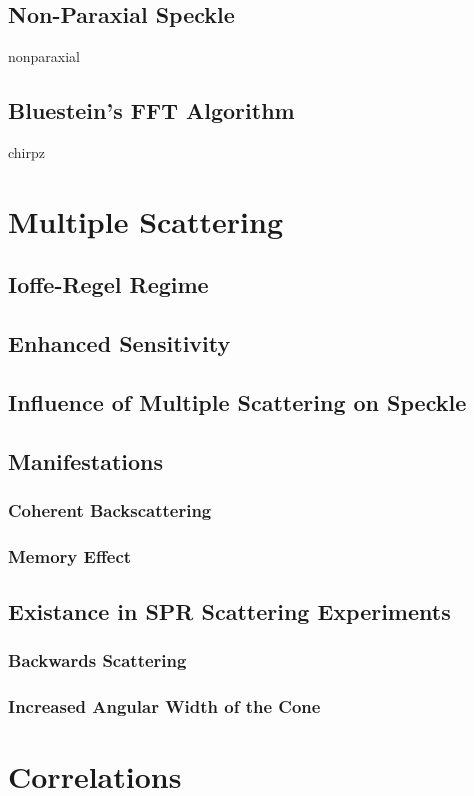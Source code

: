 \documentclass[a4paper,titlepage,onecolumn]{report}
\begin{document}
  \subsection{Non-Paraxial Speckle}
		{nonparaxial}
		\subsection{Bluestein's FFT Algorithm}
		{chirpz}
 \section{Multiple Scattering}
  \subsection{Ioffe-Regel Regime}
  \subsection{Enhanced Sensitivity}
  \subsection{Influence of Multiple Scattering on Speckle}
  \subsection{Manifestations}
   \subsubsection{Coherent Backscattering}
   \subsubsection{Memory Effect}
  \subsection{Existance in SPR Scattering Experiments}
   \subsubsection{Backwards Scattering}
   \subsubsection{Increased Angular Width of the Cone}
 \section{Correlations}
\end{document}
